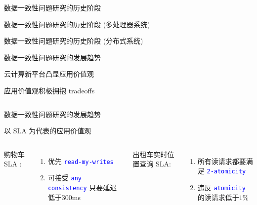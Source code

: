 \begin{frame}{数据一致性问题研究的历史阶段}
\end{frame}
\begin{frame}{数据一致性问题研究的历史阶段 (多处理器系统)}
\end{frame}
\begin{frame}{数据一致性问题研究的历史阶段 (分布式系统)}
\end{frame}
\begin{frame}{数据一致性问题研究的发展趋势}
  \begin{center}
	云计算新平台凸显应用价值观

	应用价值观积极拥抱 tradeoffs
  \end{center}

  \begin{columns}[t]
  \end{columns}
\end{frame}
\begin{frame}{数据一致性问题研究的发展趋势}
  \begin{center}
	以 SLA 为代表的应用价值观
  \end{center}


  \pause
  \vspace{0.30cm}

  \begin{columns}[t]
      购物车 SLA :
	  \begin{enumerate}
		\item 优先 \textcolor{blue}{\texttt{\small read-my-writes}}
		\item 可接受 \textcolor{blue}{\texttt{\small any consistency}} 只要延迟低于300ms
	  \end{enumerate}
	\pause
	  出租车实时位置查询 SLA:
	  \begin{enumerate}
		\item 所有读请求都要满足 \textcolor{blue}{\texttt{\small 2-atomicity}}
		\item 违反 \textcolor{blue}{\texttt{\small atomicity}} 的读请求低于$1\%$ 
	  \end{enumerate}
  \end{columns}
\end{frame}

